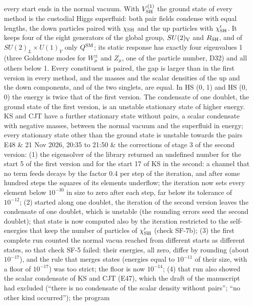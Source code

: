 \documentclass[
  10pt,
]{article}
\begin{document}
\begin{longtable}[]
every start ends in the normal vacuum. With \(V^{(1)}_{\rm SH}\) the
ground state of every method is the custodial Higgs superfluid: both
pair fields condense with equal lengths, the down particles paired with
\(\chi_{\rm SH}\) and the up particles with \(\chi'_{\rm SH}\). It keeps
four of the eight generators of the global group, \(SU(2)_{\rm V}\) and
\(R_{\rm SH}\), and of \(SU(2)_L\times U(1)_Y\) only \(Q^{\rm SM}\); its
static response has exactly four eigenvalues 1 (three Goldstone modes
for \(W^\pm_\mu\) and \(Z_\mu\), one of the particle number, D32) and
all others below 1. Every constituent is paired, the gap is larger than
in the first version in every method, and the masses and the scalar
densities of the up and the down components, and of the two singlets,
are equal. In HS (0, 1) and HS (0, 0) the energy is twice that of the
first version. The condensate of one doublet, the ground state of the
first version, is an unstable stationary state of higher energy. KS and
CJT have a further stationary state without pairs, a scalar condensate
with negative masses, between the normal vacuum and the superfluid in
energy; every stationary state other than the ground state is unstable
towards the pairs \\
E48 & 21 Nov 2026, 20:35 to 21:50 & the corrections of stage 3 of the
second version: (1) the eigensolver of the library returned an undefined
number for the start 5 of the first version and for the start 17 of KS
in the second: a channel that no term feeds decays by the factor 0.4 per
step of the iteration, and after some hundred steps the squares of its
elements underflow; the iteration now sets every element below
\(10^{-30}\) in size to zero after each step, far below its tolerance of
\(10^{-12}\); (2) started along one doublet, the iteration of the second
version leaves the condensate of one doublet, which is unstable (the
rounding errors seed the second doublet); that state is now computed
also by the iteration restricted to the self-energies that keep the
number of particles of \(\chi'_{\rm SH}\) (check SF-7b); (3) the first
complete run counted the normal vacua reached from different starts as
different states, so that check SF-5 failed: their energies, all zero,
differ by rounding (about \(10^{-17}\)), and the rule that merges states
(energies equal to \(10^{-11}\) of their size, with a floor of
\(10^{-17}\)) was too strict; the floor is now \(10^{-14}\); (4) that
run also showed the scalar condensate of KS and CJT (E47), which the
draft of the manuscript had excluded (``there is no condensate of the
scalar density without pairs''; ``no other kind occurred''); the program

\end{longtable}
\end{document}
